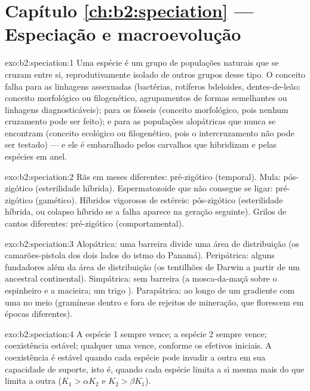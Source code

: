 \section*{Capítulo \ref{ch:b2:speciation} --- Especiação e macroevolução}

\begin{solution}{exo:b2:speciation:1}
Uma espécie é um grupo de populações naturais que se cruzam entre si,
reprodutivamente isolado de outros grupos desse tipo. O conceito falha
para as linhagens assexuadas (bactérias, rotíferos bdeloides,
dentes-de-leão: conceito morfológico ou filogenético, agrupamentos de
formas semelhantes ou linhagens diagnosticáveis); para os fósseis
(conceito morfológico, pois nenhum cruzamento pode ser feito); e para as
populações alopátricas que nunca se encontram (conceito ecológico ou
filogenético, pois o intercruzamento não pode ser testado) --- e ele é
embaralhado pelos carvalhos que hibridizam e pelas espécies em anel.
\end{solution}

\begin{solution}{exo:b2:speciation:2}
Rãs em meses diferentes: pré-zigótico (temporal). Mula: pós-zigótico
(esterilidade híbrida). Espermatozoide que não consegue se ligar:
pré-zigótico (gamético). Híbridos vigorosos de  estéreis:
pós-zigótico (esterilidade híbrida, ou colapso híbrido se a falha
aparece na geração seguinte). Grilos de cantos diferentes: pré-zigótico
(comportamental).
\end{solution}

\begin{solution}{exo:b2:speciation:3}
Alopátrica: uma barreira divide uma área de distribuição (os
camarões-pistola dos dois lados do istmo do Panamá). Peripátrica: alguns
fundadores além da área de distribuição (os tentilhões de Darwin a
partir de um ancestral continental). Simpátrica: sem barreira (a
mosca-da-maçã sobre o espinheiro e a macieira; um trigo ).
Parapátrica: ao longo de um gradiente com uma  no meio
(gramíneas dentro e fora de rejeitos de mineração, que florescem em
épocas diferentes).
\end{solution}

\begin{solution}{exo:b2:speciation:4}
A espécie 1 sempre vence; a espécie 2 sempre vence; coexistência
estável; qualquer uma vence, conforme os efetivos iniciais. A
coexistência é estável quando cada espécie pode invadir a outra em sua
capacidade de suporte, isto é, quando cada espécie limita a si mesma
mais do que limita a outra ($K_1 > \alpha K_2$ e $K_2 > \beta K_1$).
\end{solution}

